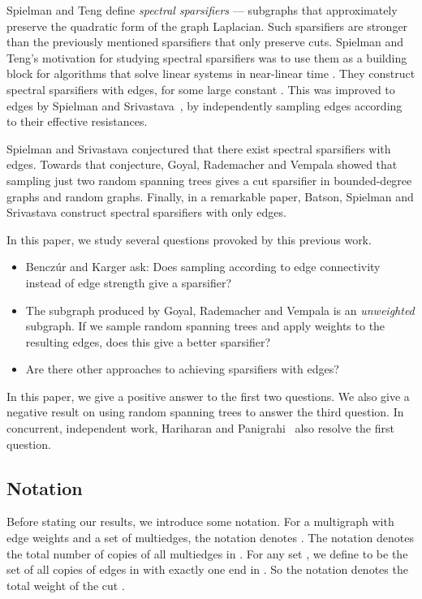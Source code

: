 \documentclass[11pt]{article}
\numberwithin{equation}{section}
\begin{document}
Spielman and Teng \cite{STConf,ST} define \textit{spectral sparsifiers} --- subgraphs
that approximately preserve the quadratic form of the graph Laplacian.
Such sparsifiers are stronger than the previously mentioned sparsifiers that only preserve cuts.
Spielman and Teng's motivation for studying spectral sparsifiers was to use them as a building
block for algorithms that solve linear systems in near-linear time \cite{STConf,SpielmanSurvey}.
They construct spectral sparsifiers with  edges, for some large constant .
This was improved to  edges by Spielman and Srivastava~\cite{SS},
by independently sampling edges according to their effective resistances.

Spielman and Srivastava conjectured that there exist spectral sparsifiers with
 edges.
Towards that conjecture, Goyal, Rademacher and Vempala \cite{GoyalRV09}
showed that sampling just two random spanning trees gives a cut sparsifier
in bounded-degree graphs and random graphs.
Finally, in a remarkable paper, Batson, Spielman and Srivastava \cite{BSS}
construct spectral sparsifiers with only  edges.

In this paper, we study several questions provoked by this previous work.
\begin{itemize}
\item Bencz\'ur and Karger ask: Does sampling according to
edge connectivity instead of edge strength give a sparsifier?
\item The subgraph produced by Goyal, Rademacher and Vempala is an \textit{unweighted}
subgraph. If we sample random spanning trees and apply weights to the resulting edges,
does this give a better sparsifier?
\item Are there other approaches to achieving sparsifiers with  edges?
\end{itemize}


In this paper, we give a positive answer to the first two questions.
We also give a negative result on using random spanning trees to answer the third question.
In concurrent, independent work, Hariharan and Panigrahi~\cite{HP} also resolve
the first question.


\subsection{Notation}

Before stating our results, we introduce some notation.
For a multigraph  with edge weights 
and a set  of multiedges,
the notation  denotes .
The notation  denotes the total number of copies of all multiedges in .
For any set , we define  to be
the set of all copies of edges in  with exactly one end in .
So the notation  denotes the total weight of the cut .
\end{document}
